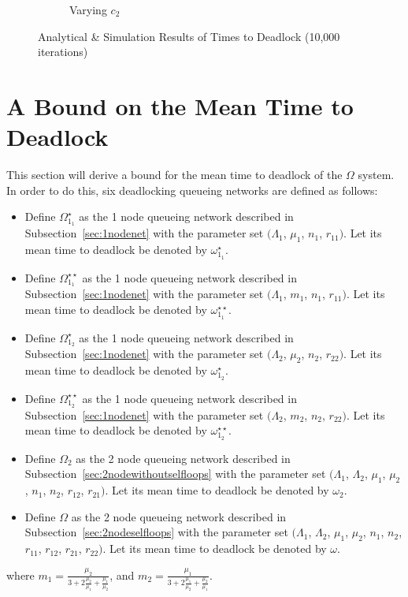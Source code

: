 \documentclass{article}
\begin{document}
\begin{figure}[!htbp]
\begin{center}
\begin{subfigure}[b]{0.34\textwidth}
    \caption{Varying $c_2$}
    \label{fig:2Nms_c2}
  \end{subfigure}
  \end{center}
  \caption{Analytical \& Simulation Results of Times to Deadlock (10,000 iterations)}
  \label{fig:timestodeadlock2nodemultiserver}
\end{figure}




\section{A Bound on the Mean Time to Deadlock}\label{sec:bound}
This section will derive a bound for the mean time to deadlock of the $\Omega$ system.
In order to do this, six deadlocking queueing networks are defined as follows:

\begin{itemize}
  \item Define $\Omega_{1_1}^{\star}$ as the 1 node queueing network described in Subsection~\ref{sec:1nodenet} with the parameter set $(\Lambda_1$, $\mu_1$, $n_1$, $r_{11})$. Let its mean time to deadlock be denoted by $\omega_{1_1}^{\star}$.
  \item Define $\Omega_{1_1}^{\star\star}$ as the 1 node queueing network described in Subsection~\ref{sec:1nodenet} with the parameter set $(\Lambda_1$, $m_1$, $n_1$, $r_{11})$. Let its mean time to deadlock be denoted by $\omega_{1_1}^{\star\star}$.
  \item Define $\Omega_{1_2}^{\star}$ as the 1 node queueing network described in Subsection~\ref{sec:1nodenet} with the parameter set $(\Lambda_2$, $\mu_2$, $n_2$, $r_{22})$. Let its mean time to deadlock be denoted by $\omega_{1_2}^{\star}$.
  \item Define $\Omega_{1_2}^{\star\star}$ as the 1 node queueing network described in Subsection~\ref{sec:1nodenet} with the parameter set $(\Lambda_2$, $m_2$, $n_2$, $r_{22})$. Let its mean time to deadlock be denoted by $\omega_{1_2}^{\star\star}$.
  \item Define $\Omega_2$ as the 2 node queueing network described in Subsection~\ref{sec:2nodewithoutselfloops} with the parameter set $(\Lambda_1$, $\Lambda_2$, $\mu_1$, $\mu_2$, $n_1$, $n_2$, $r_{12}$, $r_{21})$. Let its mean time to deadlock be denoted by $\omega_2$.
  \item Define $\Omega$ as the 2 node queueing network described in Subsection~\ref{sec:2nodeselfloops} with the parameter set $(\Lambda_1$, $\Lambda_2$, $\mu_1$, $\mu_2$, $n_1$, $n_2$, $r_{11}$, $r_{12}$, $r_{21}$, $r_{22})$. Let its mean time to deadlock be denoted by $\omega$.
\end{itemize}
where $m_1 = \frac{\mu_2}{3 + 2\frac{\mu_2}{\mu_1} + \frac{\mu_1}{\mu_2}}$, and $m_2 = \frac{\mu_1}{3 + 2\frac{\mu_1}{\mu_2} + \frac{\mu_2}{\mu_1}}$.
\end{document}
